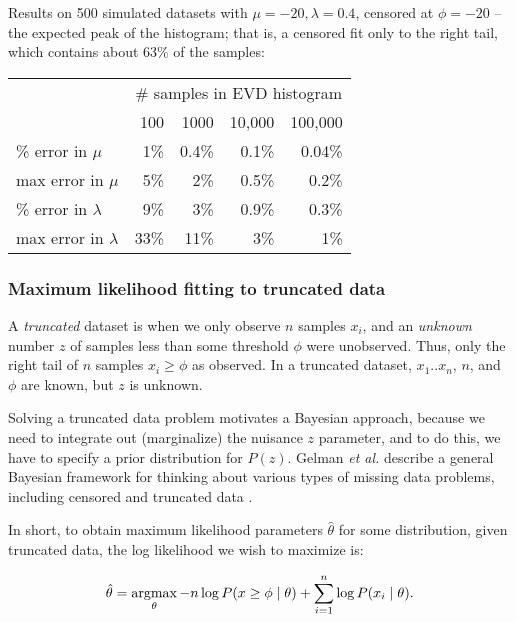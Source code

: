 Results on 500 simulated datasets with $\mu = -20, \lambda = 0.4$,
censored at $\phi = -20$ -- the expected peak of the histogram; that
is, a censored fit only to the right tail, which contains about 63\%
of the samples:

\begin{center}
\begin{tabular}{lrrrr} \hline
 & \multicolumn{4}{c}{\# samples in EVD histogram}\\
                        & 100 & 1000  & 10,000 & 100,000 \\
\% error in $\mu$       &  1\%& 0.4\% &  0.1\% &  0.04\%  \\
max error in $\mu$      &  5\%&   2\% &  0.5\% &  0.2\%  \\
\% error in $\lambda$   &  9\%&   3\% &  0.9\% &  0.3\%  \\
max error in $\lambda$  & 33\%&  11\% &    3\% &    1\%  \\ \hline
\end{tabular}
\end{center}

\subsubsection{Maximum likelihood fitting to truncated data}

A \emph{truncated} dataset is when we only observe $n$ samples $x_i$,
and an \emph{unknown} number $z$ of samples less than some threshold
$\phi$ were unobserved. Thus, only the right tail of $n$ samples $x_i
\geq \phi$ as observed. In a truncated dataset, $x_1..x_n$, $n$, and
$\phi$ are known, but $z$ is unknown.

Solving a truncated data problem motivates a Bayesian approach,
because we need to integrate out (marginalize) the nuisance $z$
parameter, and to do this, we have to specify a prior distribution for
$P(z)$. Gelman \emph{et al.} describe a general Bayesian framework for
thinking about various types of missing data problems, including
censored and truncated data \citep{Gelman95}.

In short, to obtain maximum likelihood parameters $\hat{\theta}$ for
some distribution, given truncated data, the log likelihood we wish to
maximize is:

\begin{equation}
  \hat{\theta} = \mathop{\mathrm{argmax}}\limits_\theta -n \log P(x \geq \phi \mid \theta) 
                   + \sum_{i=1}^n \log P(x_i \mid \theta).
\label{eqn:truncated_objective}
\end{equation}

